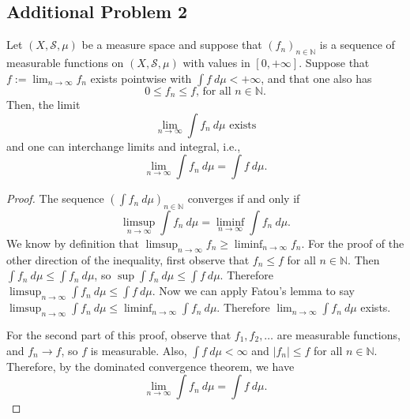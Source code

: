 \documentclass[12pt]{article}
\newcommand{\N}{\mathbb{N}}
\newcommand{\eq}[1]{\begin{equation*}#1\end{equation*}}
\begin{document}
\subsection*{Additional Problem 2}

Let $(X, \mathcal{S}, \mu)$ be a measure space and suppose that $(f_n)_{n \in \N}$ is a sequence of measurable functions on $(X, \mathcal{S}, \mu)$ with values in $[0, +\infty]$. Suppose that $f := \lim_{n \to \infty} f_n$ exists pointwise with $\int f~ d \mu < + \infty$, and that one also has \eq{0 \leq f_n \leq f \text{, for all } n \in \N.} Then, the limit \eq{\lim_{n \to \infty} \int f_n ~d \mu \text{ exists}} and one can interchange limits and integral, i.e., \eq{\lim_{n \to \infty} \int f_n ~d \mu = \int f ~d \mu.}

\begin{proof}
    The sequence $(\int f_n ~d \mu)_{n \in \N}$ converges if and only if \eq{\limsup_{n \to \infty} \int f_n ~d \mu = \liminf_{n \to \infty} \int f_n ~d \mu.} We know by definition that $\limsup_{n \to \infty} f_n \geq \liminf_{n \to \infty} f_n$. For the proof of the other direction of the inequality, first observe that $f_n \leq f$ for all $n \in \N$. Then $\int f_n ~d \mu \leq \int f_n ~d \mu$, so $\sup \int f_n ~d \mu \leq \int f ~d \mu$. Therefore $\limsup_{n \to \infty} \int f_n ~d \mu \leq \int f ~d \mu$. Now we can apply Fatou's lemma to say $\limsup_{n \to \infty} \int f_n ~d \mu \leq \liminf_{n \to \infty} \int f_n ~d \mu$. Therefore $\lim_{n \to \infty} \int f_n ~d \mu$ exists.

    For the second part of this proof, observe that $f_1, f_2, \ldots$ are measurable functions, and $f_n \to f$, so $f$ is measurable. Also, $\int f ~d \mu < \infty$ and $|f_n| \leq f$ for all $n \in \N$. Therefore, by the dominated convergence theorem, we have \eq{\lim_{n \to \infty} \int f_n ~d \mu = \int f ~d \mu.}
\end{proof}
\end{document}
